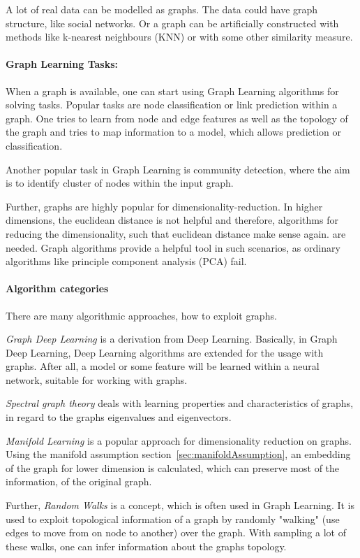 A lot of real data can be modelled as graphs. The data could have graph structure, like social networks. 
Or a graph can be artificially constructed with methods like k-nearest neighbours (KNN) or with some other similarity
measure.

\paragraph{Graph Learning Tasks:}
When a graph is available, one can start using Graph Learning algorithms for solving tasks.
Popular tasks are node classification or link prediction within a graph. One tries to learn from node and edge features 
as well as the topology of the graph and tries to map information to a model, which allows prediction or classification.

Another popular task in Graph Learning is community detection, where the aim is to identify cluster of nodes within the input graph.

Further, graphs are highly popular for dimensionality-reduction. In higher dimensions, the euclidean distance is not helpful and therefore,
algorithms for reducing the dimensionality, such that euclidean distance make sense again. are needed. 
Graph algorithms provide a helpful tool in such scenarios, as ordinary algorithms like principle component analysis (PCA) fail.

\paragraph{Algorithm categories}

There are many algorithmic approaches, how to exploit graphs. 

\textit{Graph Deep Learning} is a derivation from Deep Learning. 
Basically, in Graph Deep Learning, Deep Learning algorithms are extended for the usage with graphs.
After all, a model or some feature will be learned within a neural network, suitable for working with graphs.

\textit{Spectral graph theory}\cite{SpectralGraphTheory} deals with learning properties and characteristics of graphs, in regard to
the graphs eigenvalues and eigenvectors. 

\textit{Manifold Learning }\cite{ManifoldLearning} is a popular approach for dimensionality reduction on graphs. 
Using the manifold assumption section~\ref{sec:manifoldAssumption}, an embedding of the graph for lower dimension is calculated,
which can preserve most of the information, of the original graph.

Further, \textit{Random Walks} is a concept, which is often used in Graph Learning. 
It is used to exploit topological information of a graph by randomly "walking" (use edges to move from on node to another)
over the graph. With sampling a lot of these walks, one can infer information about the graphs topology.


